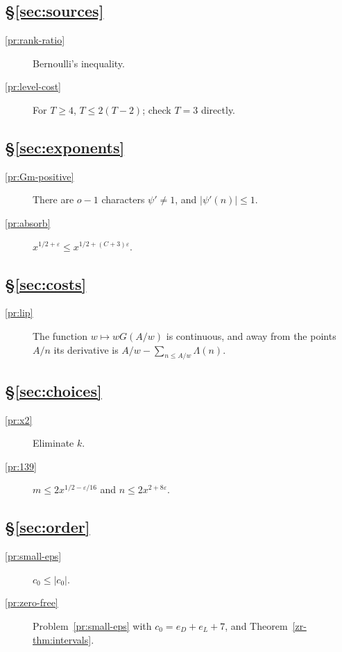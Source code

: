 \documentclass[reqno]{amsart}
\theoremstyle{definition}
\theoremstyle{plain}
\begin{document}
\subsection*{\S\ref{sec:sources}}
\begin{description}
\item[\ref{pr:rank-ratio}] Bernoulli's inequality.
\item[\ref{pr:level-cost}] For \(T \ge 4\), \(T \le 2(T - 2)\); check \(T = 3\) directly.
\end{description}

\subsection*{\S\ref{sec:exponents}}
\begin{description}
\item[\ref{pr:Gm-positive}] There are \(o - 1\) characters \(\psi' \ne 1\), and \(\lvert\psi'(n)\rvert \le 1\).
\item[\ref{pr:absorb}] \(x^{1/2+\varepsilon} \le x^{1/2+(C+3)\varepsilon}\).
\end{description}

\subsection*{\S\ref{sec:costs}}
\begin{description}
\item[\ref{pr:lip}] The function \(w \mapsto wG(A/w)\) is continuous, and away from the points \(A/n\) its derivative is \(A/w - \sum_{n \le A/w}\Lambda(n)\).
\end{description}

\subsection*{\S\ref{sec:choices}}
\begin{description}
\item[\ref{pr:x2}] Eliminate \(k\).
\item[\ref{pr:139}] \(m \le 2x^{1/2-\varepsilon/16}\) and \(n \le 2x^{2+8\varepsilon}\).
\end{description}

\subsection*{\S\ref{sec:order}}
\begin{description}
\item[\ref{pr:small-eps}] \(c_0 \le \lvert c_0\rvert\).
\item[\ref{pr:zero-free}] Problem~\ref{pr:small-eps} with \(c_0 = e_D + e_L + 7\), and Theorem~\ref{zr-thm:intervals}.
\end{description}
\end{document}

